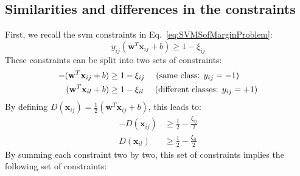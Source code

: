 \subsection{Similarities and differences in the constraints}
\noindent First, we recall the {\sc svm} constraints in Eq.~\ref{eq:SVMSofMarginProblem}:
\begin{equation*}
y_{ij}(\textbf{w}^T\textbf{x}_{ij}+b) \geq 1-\xi_{ij} 
\end{equation*}
\noindent These constraints can be split into two sets of constraints:
\begin{equation*}
\begin{aligned}
-(\textbf{w}^T\textbf{x}_{ij}+b) & \geq 1-\xi_{ij} \text{ \quad (same class: $y_{ij}=-1$)} \\
(\textbf{w}^T\textbf{x}_{il}+b) & \geq 1-\xi_{il} \text{ \quad  (different classes: $y_{ij}=+1$)}
\end{aligned}
\end{equation*}
\noindent By defining $D(\textbf{x}_{ij})=\frac{1}{2}(\textbf{w}^T\textbf{x}_{ij}+b)$, this leads to:
\begin{equation*}
\begin{aligned}
-D(\textbf{x}_{ij}) & \geq \frac{1}{2}-\frac{\xi_{ij}}{2} \\
D(\textbf{x}_{il}) & \geq \frac{1}{2}-\frac{\xi_{il}}{2}
\end{aligned}
\end{equation*}  
\noindent By summing each constraint two by two, this set of constraints implies the following set of constraints: \\
 \\

